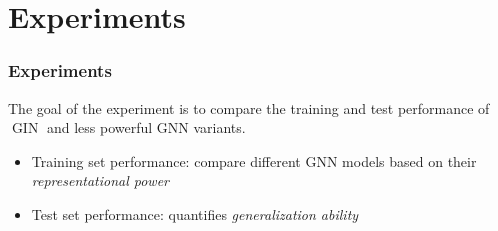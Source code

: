 \documentclass{beamer}
\DeclareMathOperator{\gin}{GIN}
\begin{document}

\section{Experiments}

\begin{frame}
\frametitle{Experiments}

The goal of the experiment is to compare the training and test performance of $\gin$ and less powerful GNN variants. \pause

\begin{itemize}
	\item Training set performance: compare different GNN models based on their {\it representational power}

	\item Test set performance: quantifies {\it generalization ability}
\end{itemize}

\end{frame}

\end{document}
